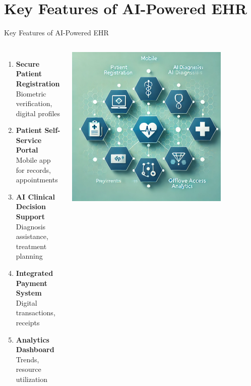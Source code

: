 \documentclass[aspectratio=169]{beamer}
\begin{document}
\section{Key Features of AI-Powered EHR}
\begin{frame}{Key Features of AI-Powered EHR}
    \begin{columns}[T]
            \begin{enumerate}
                \item \textbf{Secure Patient Registration}\\
                Biometric verification, digital profiles
                
                \item \textbf{Patient Self-Service Portal}\\
                Mobile app for records, appointments
                
                \item \textbf{AI Clinical Decision Support}\\
                Diagnosis assistance, treatment planning
                
                \item \textbf{Integrated Payment System}\\
                Digital transactions, receipts
                
                \item \textbf{Analytics Dashboard}\\
                Trends, resource utilization
            \end{enumerate}
            \includegraphics[width=0.8\textwidth]{features_illustration.png}
    \end{columns}
\end{frame}
\end{document}
